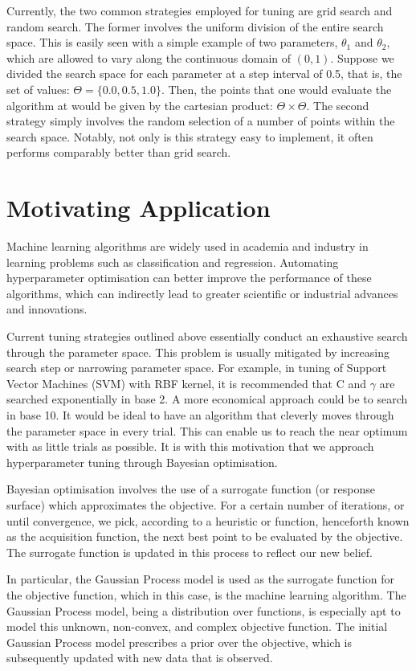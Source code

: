 \documentclass[letterpaper]{article}
\begin{document}
Currently, the two common strategies employed for tuning are grid search and
random search. The former involves the uniform division of the entire search
space. This is easily seen with a simple example of two parameters, $\theta_1$ and
$\theta_2$, which are allowed to vary along the continuous domain of $(0, 1)$.
Suppose we divided the search space for each parameter at a step interval of 0.5,
that is, the set of values: $\Theta=\{0.0, 0.5, 1.0\}$. Then, the points that one
would evaluate the algorithm at would be given by the cartesian product: $\Theta \times \Theta$.
The second strategy simply involves the random selection of a number of points
within the search space. Notably, not only is this strategy easy to implement, it
often performs comparably better than grid search.

\section{Motivating Application}
Machine learning algorithms are widely used in academia and industry in learning
problems such as classification and regression. Automating hyperparameter optimisation
can better improve the performance of these algorithms, which can indirectly lead
to greater scientific or industrial advances and innovations.

Current tuning strategies outlined above essentially conduct an exhaustive search
through the parameter space. This problem is usually mitigated by increasing search step or narrowing parameter space. For example, in tuning of Support Vector Machines (SVM) with RBF kernel, it is recommended that C and $\gamma$ are searched exponentially in base 2. A more economical approach could be to search in base 10. It would be ideal to have an algorithm that cleverly moves through the parameter space in every trial. This can enable us to reach the near optimum with as little trials as possible. It is with this motivation that we approach hyperparameter tuning through Bayesian optimisation.

Bayesian optimisation involves the use of a surrogate function (or response surface)
which approximates the objective. For a certain number of iterations, or until
convergence, we pick, according to a heuristic or function, henceforth known as the
acquisition function, the next best point to be evaluated by the objective. The
surrogate function is updated in this process to reflect our new belief.

In particular, the Gaussian Process model is used as the surrogate function
for the objective function, which in this case, is the machine learning algorithm.
The Gaussian Process model, being a distribution over functions, is especially apt
to model this unknown, non-convex, and complex objective function. The
initial Gaussian Process model prescribes a prior over the objective, which is
subsequently updated with new data that is observed.
\end{document}
